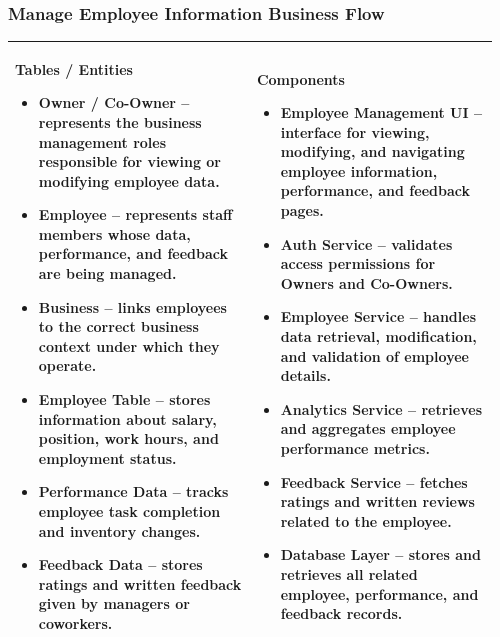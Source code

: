 \documentclass[]{VUMIFTemplateClass}
\newenvironment{mpitemlist}[1][\linewidth]{%
    \begin{minipage}[t]{#1}%
        \setlength{\leftmargini}{12pt}%
        \begin{itemize}%
            \setlength{\itemsep}{1pt}%
            \setlength{\parskip}{0pt}%
            \setlength{\parsep}{0pt}%
}{%
        \end{itemize}%
    \end{minipage}\newline
}
\begin{document}
\subsubsection{Manage Employee Information Business Flow}
\begin{center}
\setlength{\tabcolsep}{8pt}
\renewcommand{\arraystretch}{1.3}
\begin{tabular}{|p{0.48\linewidth}|p{0.48\linewidth}|}
\hline
\textbf{Tables / Entities} \newline
\begin{mpitemlist}
\item \textbf{Owner / Co-Owner} – represents the business management roles responsible for viewing or modifying employee data.
\item \textbf{Employee} – represents staff members whose data, performance, and feedback are being managed.
\item \textbf{Business} – links employees to the correct business context under which they operate.
\item \textbf{Employee Table} – stores information about salary, position, work hours, and employment status.
\item \textbf{Performance Data} – tracks employee task completion and inventory changes.
\item \textbf{Feedback Data} – stores ratings and written feedback given by managers or coworkers.
\end{mpitemlist}
&
\textbf{Components} \newline
\begin{mpitemlist}
\item \textbf{Employee Management UI} – interface for viewing, modifying, and navigating employee information, performance, and feedback pages.
\item \textbf{Auth Service} – validates access permissions for Owners and Co-Owners.
\item \textbf{Employee Service} – handles data retrieval, modification, and validation of employee details.
\item \textbf{Analytics Service} – retrieves and aggregates employee performance metrics.
\item \textbf{Feedback Service} – fetches ratings and written reviews related to the employee.
\item \textbf{Database Layer} – stores and retrieves all related employee, performance, and feedback records.
\end{mpitemlist}
\\ \hline

\end{tabular}
\end{center}
\end{document}
